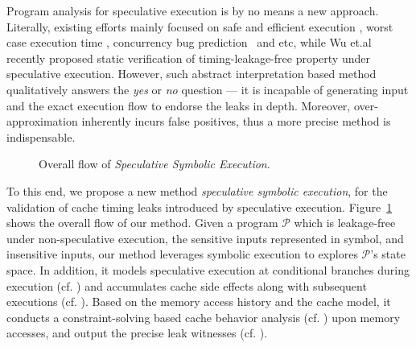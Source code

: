 \documentclass[sigconf]{acmart}
\newcommand\ignore[1]{}
\newcommand*\circled[1]{\tikz[baseline=(char.base)]{
				\node[shape=circle,draw,inner sep=.4pt] (char) {\scriptsize{#1}};}}
\newcommand{\prog}{\mathcal{P}}
\begin{document}
Program analysis for speculative execution is by no means a new approach. 
Literally, existing efforts mainly focused on safe and efficient execution
\cite{ChenLDHY04,PrabhuRV10,GuarnieriKMRS19}, worst case execution time 
\cite{LiMR03,LiMR05}, concurrency bug prediction~\cite{ChenWYS09,LiELS05} 
and etc, while Wu et.al~\cite{WuW19} recently proposed static verification 
of timing-leakage-free property under speculative execution. However, such 
abstract interpretation based method~\cite{WuW19} qualitatively answers 
the \textit{yes} or \textit{no} question --- it is incapable of generating 
input and the exact execution flow to endorse the leaks in depth. Moreover, 
over-approximation inherently incurs false positives, thus a more precise 
method is indispensable.


\begin{figure}
  \vspace{1ex}
  \centering
  \scalebox{0.95}{}
  \caption{Overall flow of \emph{Speculative Symbolic Execution}.}
  \label{fig:overall_flow}
\end{figure}


To this end, we propose a new method \textit{speculative symbolic execution}, 
for the validation of cache timing leaks introduced by speculative execution. 
Figure~\ref{fig:overall_flow} shows the overall flow of our method. Given a 
program $\prog$ which is leakage-free under non-speculative execution, the 
sensitive inputs represented in symbol, and insensitive inputs, our method
leverages symbolic execution to explores $\prog$'s state space. 
In addition, it models speculative execution at conditional branches during 
execution (cf. \circled{1}) and accumulates cache side effects along with 
subsequent executions (cf. \circled{2}). Based on the memory access history 
and the cache model, it conducts a constraint-solving based cache behavior 
analysis (cf. \circled{3}) upon memory accesses, and output the precise 
leak witnesses (cf. \circled{4}). 


\ignore{
To be specific, the symbolic input reflects the leaks that 
are relevant to secret, the speculative execution modeling supplies behavioral 
simulation on program paths, the cache modeling forms leak exposure constraints 
while the the cache analysis discloses divergent cache behaviors at an identified 
execution flow. 
}
\end{document}
